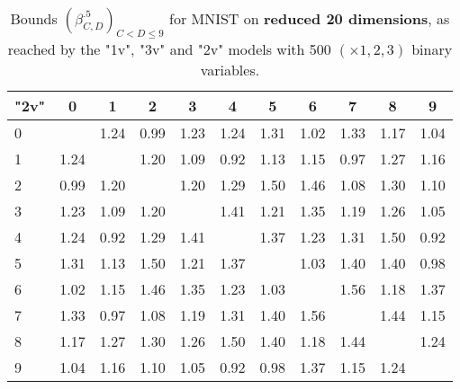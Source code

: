 \begin{table*}
\vspace{0.3cm}

	\begin{tabular}{|l||c|c|c|c|c|c|c|c|c|c|}\hline
		{\bf "2v"} & 0 & 1 & 2 & 3 & 4 & 5 & 6 & 7 & 8 & 9 \\\hline\hline
	0 & &1.24 &0.99 &1.23 &1.24 &1.31 &1.02 &1.33 &1.17 &1.04  \\\hline
	1 &1.24 & &1.20 &1.09 &0.92 &1.13 &1.15 &0.97 &1.27 &1.16  \\\hline
	2 &0.99 &1.20 & &1.20 &1.29 &1.50 &1.46 &1.08 &1.30 &1.10  \\\hline
	3 &1.23 &1.09 &1.20 & &1.41 &1.21 &1.35 &1.19 &1.26 &1.05  \\\hline
	4 &1.24 &0.92 &1.29 &1.41 & &1.37 &1.23 &1.31 &1.50 &0.92  \\\hline
	5 &1.31 &1.13 &1.50 &1.21 &1.37 & &1.03 &1.40 &1.40 &0.98  \\\hline
	6 &1.02 &1.15 &1.46 &1.35 &1.23 &1.03 & &1.56 &1.18 &1.37  \\\hline
	7 &1.33 &0.97 &1.08 &1.19 &1.31 &1.40 &1.56 & &1.44 &1.15  \\\hline
	8 &1.17 &1.27 &1.30 &1.26 &1.50 &1.40 &1.18 &1.44 & &1.24  \\\hline
	9 &1.04 &1.16 &1.10 &1.05 &0.92 &0.98 &1.37 &1.15 &1.24 &  \\\hline
	\end{tabular}
	
	\caption{Bounds $(\beta^{.5}_{C,D})_{C < D \leq 9}$ 
	for MNIST on {\bf reduced 20 dimensions}, as reached by the "1v", "3v" and "2v" models
	with 500 $(\times 1,2,3)$ binary variables.}
    \label{table.pair}
\end{table*}

